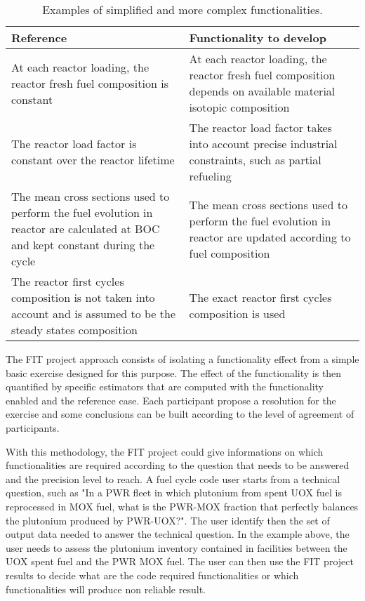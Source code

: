 \begin{table}[h]
\centering
\begin{tabular}{ |p{}|p{}| }
  \hline
  Reference & Functionality to develop \\
  \hline
  At each reactor loading, the reactor fresh fuel composition is constant & At each reactor loading, the reactor fresh fuel composition depends on available material isotopic composition \\
  \hline
  The reactor load factor is constant over the reactor lifetime & The reactor load factor takes into account precise industrial constraints, such as partial refueling \\
  \hline
  The mean cross sections used to perform the fuel evolution in reactor are calculated at BOC and kept constant during the cycle & The mean cross sections used to perform the fuel evolution in reactor are updated according to fuel composition \\
  \hline
  The reactor first cycles composition is not taken into account and is assumed to be the steady states composition & The exact reactor first cycles composition is used \\
  \hline
\end{tabular}
\label{Tab:Funct}
\caption{Examples of simplified and more complex functionalities.}
\end{table}

The FIT project approach consists of isolating a functionality effect from a simple basic exercise designed for this purpose. The effect of the functionality is then quantified by specific estimators that are computed with the functionality enabled and the reference case. Each participant propose a resolution for the exercise and some conclusions can be built according to the level of agreement of participants.

With this methodology, the FIT project could give informations on which functionalities are required according to the question that needs to be answered and the precision level to reach. A fuel cycle code user starts from a technical question, such as "In a PWR fleet in which plutonium from spent UOX fuel is reprocessed in MOX fuel, what is the PWR-MOX fraction that perfectly balances the plutonium produced by PWR-UOX?". The user identify then the set of output data needed to answer the technical question. In the example above, the user needs to assess the plutonium inventory contained in facilities between the UOX spent fuel and the PWR MOX fuel. The user can then use the FIT project results to decide what are the code required functionalities or which functionalities will produce non reliable result. 

